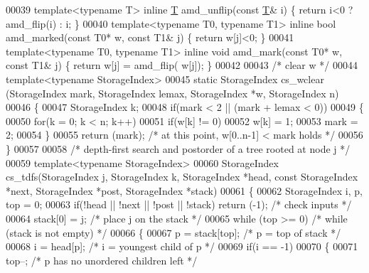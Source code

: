 \begin{DoxyCode}
00039 \textcolor{keyword}{template}<\textcolor{keyword}{typename} T> \textcolor{keyword}{inline} \hyperlink{group___sparse_core___module_class_eigen_1_1_triplet}{T} amd\_unflip(\textcolor{keyword}{const} \hyperlink{group___sparse_core___module_class_eigen_1_1_triplet}{T}& i) \{ \textcolor{keywordflow}{return} i<0 ? amd\_flip(i) : i; \}
00040 \textcolor{keyword}{template}<\textcolor{keyword}{typename} T0, \textcolor{keyword}{typename} T1> \textcolor{keyword}{inline} \textcolor{keywordtype}{bool} amd\_marked(\textcolor{keyword}{const} T0* w, \textcolor{keyword}{const} T1& j) \{ \textcolor{keywordflow}{return} w[j]<0; \}
00041 \textcolor{keyword}{template}<\textcolor{keyword}{typename} T0, \textcolor{keyword}{typename} T1> \textcolor{keyword}{inline} \textcolor{keywordtype}{void} amd\_mark(\textcolor{keyword}{const} T0* w, \textcolor{keyword}{const} T1& j) \{ \textcolor{keywordflow}{return} w[j] = amd\_flip(
      w[j]); \}
00042 
00043 \textcolor{comment}{/* clear w */}
00044 \textcolor{keyword}{template}<\textcolor{keyword}{typename} StorageIndex>
00045 \textcolor{keyword}{static} StorageIndex cs\_wclear (StorageIndex mark, StorageIndex lemax, StorageIndex *w, StorageIndex n)
00046 \{
00047   StorageIndex k;
00048   \textcolor{keywordflow}{if}(mark < 2 || (mark + lemax < 0))
00049   \{
00050     \textcolor{keywordflow}{for}(k = 0; k < n; k++)
00051       \textcolor{keywordflow}{if}(w[k] != 0)
00052         w[k] = 1;
00053     mark = 2;
00054   \}
00055   \textcolor{keywordflow}{return} (mark);     \textcolor{comment}{/* at this point, w[0..n-1] < mark holds */}
00056 \}
00057 
00058 \textcolor{comment}{/* depth-first search and postorder of a tree rooted at node j */}
00059 \textcolor{keyword}{template}<\textcolor{keyword}{typename} StorageIndex>
00060 StorageIndex cs\_tdfs(StorageIndex j, StorageIndex k, StorageIndex *head, \textcolor{keyword}{const} StorageIndex *next, 
      StorageIndex *post, StorageIndex *stack)
00061 \{
00062   StorageIndex i, p, top = 0;
00063   \textcolor{keywordflow}{if}(!head || !next || !post || !stack) \textcolor{keywordflow}{return} (-1);    \textcolor{comment}{/* check inputs */}
00064   stack[0] = j;                 \textcolor{comment}{/* place j on the stack */}
00065   \textcolor{keywordflow}{while} (top >= 0)                \textcolor{comment}{/* while (stack is not empty) */}
00066   \{
00067     p = stack[top];           \textcolor{comment}{/* p = top of stack */}
00068     i = head[p];              \textcolor{comment}{/* i = youngest child of p */}
00069     \textcolor{keywordflow}{if}(i == -1)
00070     \{
00071       top--;                 \textcolor{comment}{/* p has no unordered children left */}

\end{DoxyCode}
